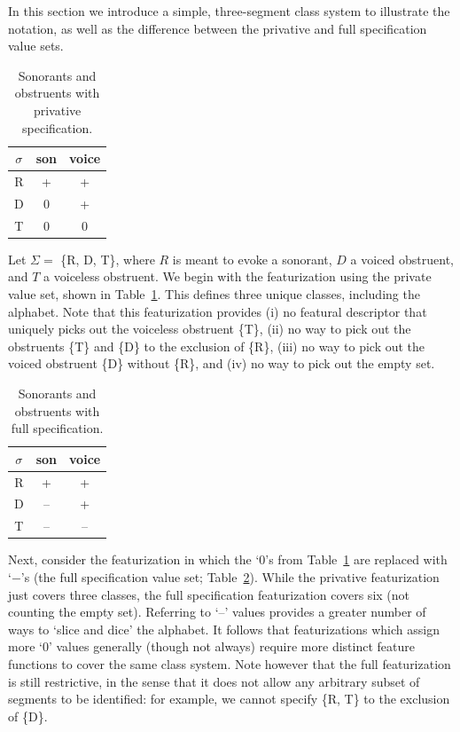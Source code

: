 \documentclass[12pt, oneside]{article}   	%
\begin{document}
In this section we introduce a simple, three-segment class system to illustrate the notation, as well as the difference between the privative and full specification value sets.

\begin{table}[h]
	\centering
	\begin{tabular} {|c||c|c|}
		\hline
		$\sigma$ & son & voice \\ \hline
		R & + & + \\
		D & 0 & + \\
		T & 0 & 0 \\
		\hline
	\end{tabular}
	\caption{Sonorants and obstruents with privative specification.}
	\label{table:privative}
\end{table}

Let $\Sigma =$ \{R, D, T\}, where $R$ is meant to evoke a sonorant, $D$ a voiced obstruent, and $T$ a voiceless obstruent. We begin with the featurization using the private value set, shown in Table~\ref{table:privative}. This defines three unique classes, including the alphabet. Note that this featurization provides (i) no featural descriptor that uniquely picks out the voiceless obstruent \{T\}, (ii) no way to pick out the obstruents \{T\} and \{D\} to the exclusion of \{R\}, (iii) no way to pick out the voiced obstruent \{D\} without \{R\}, and (iv) no way to pick out the empty set.

\begin{table}[h]
	\centering
	\begin{tabular} {|c||c|c|}
		\hline
		$\sigma$ & son & voice \\ \hline
		R & + & + \\
		D & -- & + \\
		T & -- & -- \\
		\hline
	\end{tabular}
	\caption{Sonorants and obstruents with full specification.}
	\label{table:full}
\end{table}
Next, consider the featurization in which the `$0$'s from Table~\ref{table:privative} are replaced with `$-$'s (the full specification value set; Table~\ref{table:full}).  While the privative featurization just covers three classes, the full specification featurization covers six (not counting the empty set). Referring to `--' values provides a greater number of ways to `slice and dice' the alphabet. It follows that featurizations which assign more `$0$' values generally (though not always) require more distinct feature functions to cover the same class system. Note however that the full featurization is still restrictive, in the sense that it does not allow any arbitrary subset of segments to be identified: for example, we cannot specify \{R, T\} to the exclusion of \{D\}.
\end{document}
